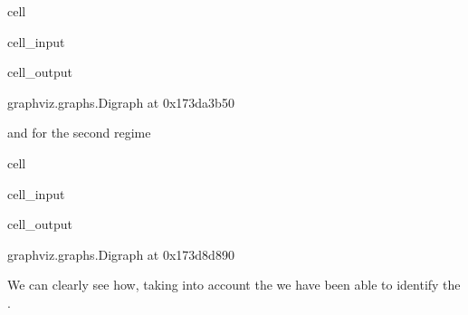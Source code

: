 \documentclass[letterpaper,10pt,english]{jupyterBook}
\begin{document}
\begin{sphinxuseclass}{cell}\begin{sphinxVerbatimInput}

\begin{sphinxuseclass}{cell_input}
\begin{sphinxVerbatim}[commandchars=\\\{\}]
  
\end{sphinxVerbatim}

\end{sphinxuseclass}\end{sphinxVerbatimInput}
\begin{sphinxVerbatimOutput}

\begin{sphinxuseclass}{cell_output}
\begin{sphinxVerbatim}[commandchars=\\\{\}]
\PYGZlt{}graphviz.graphs.Digraph at 0x173da3b50\PYGZgt{}
\end{sphinxVerbatim}

\end{sphinxuseclass}\end{sphinxVerbatimOutput}

\end{sphinxuseclass}
\sphinxAtStartPar
and for the second regime

\begin{sphinxuseclass}{cell}\begin{sphinxVerbatimInput}

\begin{sphinxuseclass}{cell_input}
\begin{sphinxVerbatim}[commandchars=\\\{\}]
 
\end{sphinxVerbatim}

\end{sphinxuseclass}\end{sphinxVerbatimInput}
\begin{sphinxVerbatimOutput}

\begin{sphinxuseclass}{cell_output}
\begin{sphinxVerbatim}[commandchars=\\\{\}]
\PYGZlt{}graphviz.graphs.Digraph at 0x173d8d890\PYGZgt{}
\end{sphinxVerbatim}

\end{sphinxuseclass}\end{sphinxVerbatimOutput}

\end{sphinxuseclass}
\sphinxAtStartPar
We can clearly see how, taking into account the  we have been able to identify the .
\end{document}
